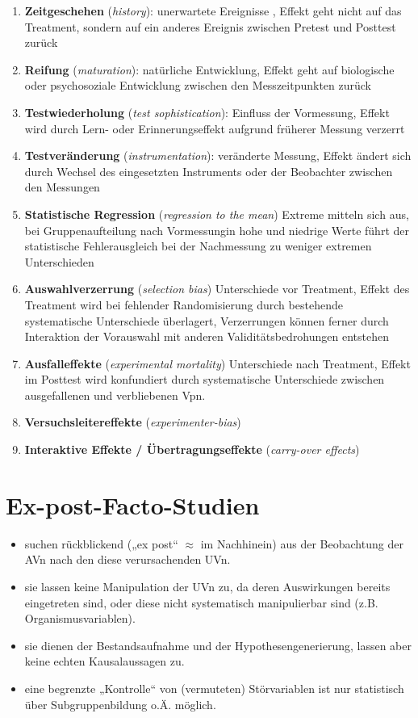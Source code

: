 \documentclass[
]{book}
\begin{document}
\begin{enumerate}
\def\labelenumi{\arabic{enumi}.}
\item
  \textbf{Zeitgeschehen} (\emph{history}): unerwartete Ereignisse , Effekt geht nicht auf das
  Treatment, sondern auf ein anderes Ereignis zwischen Pretest und Posttest
  zurück
\item
  \textbf{Reifung} (\emph{maturation}): natürliche Entwicklung, Effekt geht auf biologische
  oder psychosoziale Entwicklung zwischen den Messzeitpunkten zurück
\item
  \textbf{Testwiederholung} (\emph{test sophistication}): Einfluss der Vormessung, Effekt wird
  durch Lern- oder Erinnerungseffekt aufgrund früherer Messung verzerrt
\item
  \textbf{Testveränderung} (\emph{instrumentation}): veränderte Messung, Effekt ändert sich
  durch Wechsel des eingesetzten Instruments oder der Beobachter zwischen
  den Messungen
\item
  \textbf{Statistische Regression} (\emph{regression to the mean}) Extreme mitteln sich aus, bei Gruppenaufteilung nach Vormessungin hohe und niedrige Werte führt der
  statistische Fehlerausgleich bei der Nachmessung zu weniger extremen
  Unterschieden
\item
  \textbf{Auswahlverzerrung} (\emph{selection bias}) Unterschiede vor Treatment, Effekt des
  Treatment wird bei fehlender Randomisierung durch bestehende systematische
  Unterschiede überlagert, Verzerrungen können ferner durch Interaktion der
  Vorauswahl mit anderen Validitätsbedrohungen entstehen
\item
  \textbf{Ausfalleffekte} (\emph{experimental mortality}) Unterschiede nach Treatment, Effekt im
  Posttest wird konfundiert durch systematische Unterschiede zwischen
  ausgefallenen und verbliebenen Vpn.
\item
  \textbf{Versuchsleitereffekte} (\emph{experimenter-bias})
\item
  \textbf{Interaktive Effekte / Übertragungseffekte} (\emph{carry-over effects})
\end{enumerate}

\hypertarget{ex-post-facto-studien}{%
\section{Ex-post-Facto-Studien}\label{ex-post-facto-studien}}

\begin{itemize}
\item
  suchen rückblickend („ex post`` \(\approx\) im Nachhinein) aus der Beobachtung der AVn
  nach den diese verursachenden UVn.
\item
  sie lassen keine Manipulation der UVn zu, da deren Auswirkungen bereits
  eingetreten sind, oder diese nicht systematisch manipulierbar sind (z.B.
  Organismusvariablen).
\item
  sie dienen der Bestandsaufnahme und der Hypothesengenerierung,
  lassen aber keine echten Kausalaussagen zu.
\item
  eine begrenzte „Kontrolle`` von (vermuteten) Störvariablen ist nur statistisch
  über Subgruppenbildung o.Ä. möglich.
\end{itemize}
\end{document}
